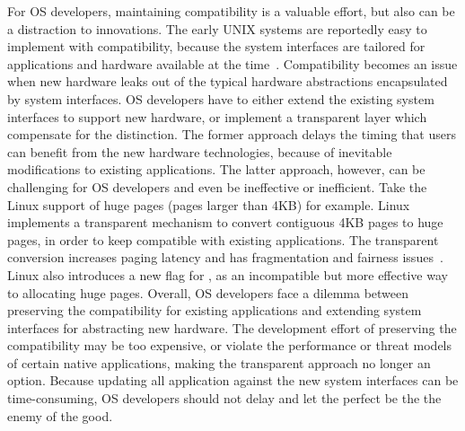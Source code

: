 For OS developers, maintaining compatibility is a valuable effort, 
but also can be a distraction to innovations.
The early UNIX systems are reportedly easy to implement with compatibility, because
the system interfaces are tailored
for applications and hardware available at the time~\cite{ritchie78unix-retro}.
Compatibility becomes an issue
when new hardware leaks out of the typical hardware abstractions
encapsulated by system interfaces.
OS developers have to either extend the existing system interfaces
to support new hardware,
or implement a transparent layer which compensate for the distinction.
The former approach delays the timing that users can benefit from the new hardware technologies, because of inevitable modifications to existing applications.
The latter approach, however, can be challenging for OS developers
and even be ineffective or inefficient.
Take the Linux support of huge pages (pages larger than 4KB) for example.
Linux implements a transparent mechanism to convert contiguous 4KB pages to huge pages, in order to keep  compatible with existing applications.
The transparent conversion increases paging latency 
and has fragmentation and fairness issues~\cite{kwon16ingens}.
Linux also introduces a new flag  for , as an incompatible but more effective way to allocating huge pages.
Overall, OS developers face a dilemma between preserving the compatibility for existing applications and extending system interfaces for abstracting new hardware.
The development effort of preserving the compatibility may be too expensive,
or violate the performance or threat models of certain native applications, making the transparent approach no longer an option.
Because updating all application against the new system interfaces
can be time-consuming,
OS developers should not delay and let the perfect be the the enemy of the good.

